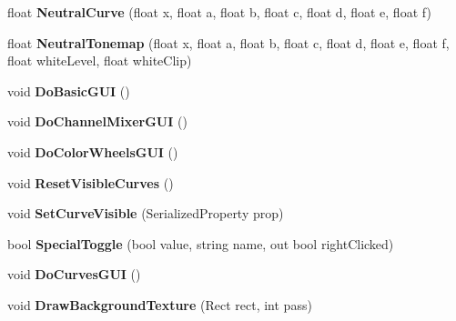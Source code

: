 \begin{DoxyCompactItemize}
float {\bfseries Neutral\+Curve} (float x, float a, float b, float c, float d, float e, float f)
\item 
\mbox{\label{class_unity_editor_1_1_post_processing_1_1_color_grading_model_editor_a87b14e6dca2df7118635d58d27836196}} 
float {\bfseries Neutral\+Tonemap} (float x, float a, float b, float c, float d, float e, float f, float white\+Level, float white\+Clip)
\item 
\mbox{\label{class_unity_editor_1_1_post_processing_1_1_color_grading_model_editor_a7f05966115cbe2b35e04af4f99a7e315}} 
void {\bfseries Do\+Basic\+G\+UI} ()
\item 
\mbox{\label{class_unity_editor_1_1_post_processing_1_1_color_grading_model_editor_aa65b499335c8d92d0f7a5c9a3cdee4b0}} 
void {\bfseries Do\+Channel\+Mixer\+G\+UI} ()
\item 
\mbox{\label{class_unity_editor_1_1_post_processing_1_1_color_grading_model_editor_a033cdc58307a182ccf59897060ff094e}} 
void {\bfseries Do\+Color\+Wheels\+G\+UI} ()
\item 
\mbox{\label{class_unity_editor_1_1_post_processing_1_1_color_grading_model_editor_ad03c2e80c64099dc8f2828166b862488}} 
void {\bfseries Reset\+Visible\+Curves} ()
\item 
\mbox{\label{class_unity_editor_1_1_post_processing_1_1_color_grading_model_editor_acc3b74043cfc9975a0bc3b25ae7bd9c2}} 
void {\bfseries Set\+Curve\+Visible} (Serialized\+Property prop)
\item 
\mbox{\label{class_unity_editor_1_1_post_processing_1_1_color_grading_model_editor_aa13cc60c085b1282df05077c5dedaee8}} 
bool {\bfseries Special\+Toggle} (bool value, string name, out bool right\+Clicked)
\item 
\mbox{\label{class_unity_editor_1_1_post_processing_1_1_color_grading_model_editor_a0ddf0edd4f583c6b98b24b195ed98c3b}} 
void {\bfseries Do\+Curves\+G\+UI} ()
\item 
\mbox{\label{class_unity_editor_1_1_post_processing_1_1_color_grading_model_editor_a2626dc29f3a978c149d921717daee940}} 
void {\bfseries Draw\+Background\+Texture} (Rect rect, int pass)
\end{DoxyCompactItemize}
